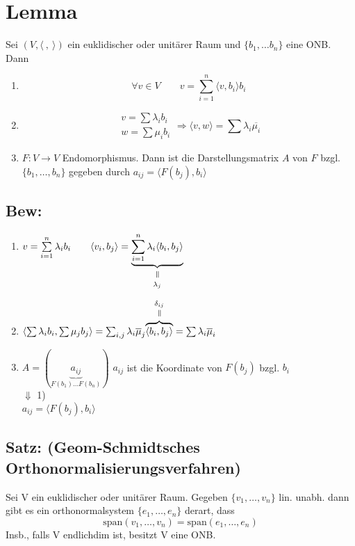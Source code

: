 \documentclass[titlepage,12pt,a4paper,ngerman]{report}
\newcommand{\verteq}{\rotatebox{90}{$\,=$}}
\newcommand{\equalto}[2]{\underset{\scriptstyle\overset{\mkern4mu\verteq}{#2}}{#1}}
\newcommand{\equaltoup}[2]{\overset{\scriptstyle\underset{\mkern4mu\verteq}{#2}}{#1}}
\newcommand{\tx}[1]{\textrm{#1}}
\newcommand{\ub}[1]{\underbrace{#1}}
\newcommand{\spa}{\tx{span}}
\newcommand{\summ}[2]{\sum_{#1}^{#2}}
\begin{document}
\section{Lemma} Sei $(V, \langle\ ,\ \rangle)$ ein euklidischer oder unitärer Raum und $\{b_1, \dots b_n \}$ eine ONB. Dann
\begin{enumerate}
	\item $$\forall v \in V \qquad v = \summ{i=1}{n} \langle v,b_i \rangle b_i$$
	\item $$\begin{array}{c} v = \sum \lambda_i b_i \\ w = \sum \mu_i b_i \end{array} \Rightarrow \langle v,w \rangle = \sum \lambda_i \overline{\mu_i}$$
	\item $ F: V \to V $ Endomorphismus. Dann ist die Darstellungsmatrix $ A $ von $ F $ bzgl. $ \{b_1, \dots , b_n\} $ gegeben durch $ a_{ij} = \langle F(b_j),b_i \rangle $
\end{enumerate}

\subsection{Bew:}
\begin{enumerate}[1)]
	\item $ v = \sum\limits_{i=1}^{n} \lambda_i b_i \qquad \langle v_i,b_j \rangle = \equalto{\ub{\sum\limits_{i=1}^{n} \lambda_i \langle b_i, b_j \rangle }}{\lambda_j} $
	\item $ \langle \sum \lambda_i b_i, \sum \mu_j b_j \rangle = \sum_{i,j} \lambda_i \overline{\mu}_j \equaltoup{\overbrace{\langle b_i,b_j \rangle}}{\delta_{ij}} = \sum \lambda_i \overline{\mu}_i $
	\item  $ A = (\ub{a_{ij}}_{F(b_1) \dots F(b_n)}) $ $ a_{ij} $ ist die Koordinate von $ F(b_j) $ bzgl. $ b_i $\\
	$ \Downarrow $ 1)\\
	$ a_{ij} = \langle F(b_j),b_i \rangle $
\end{enumerate}
\subsection{Satz: (Geom-Schmidtsches Orthonormalisierungsverfahren)}
Sei V ein euklidischer oder unitärer Raum. Gegeben $ \{v_1,\dots , v_n \} $ lin. unabh. dann gibt es ein orthonormalsystem $ \{e_1,\dots , e_n \} $ derart, dass
$$\spa(v_1,\dots,v_n) = \spa(e_1,\dots,e_n)$$
Insb., falls V endlichdim ist, besitzt V eine ONB.
\end{document}
